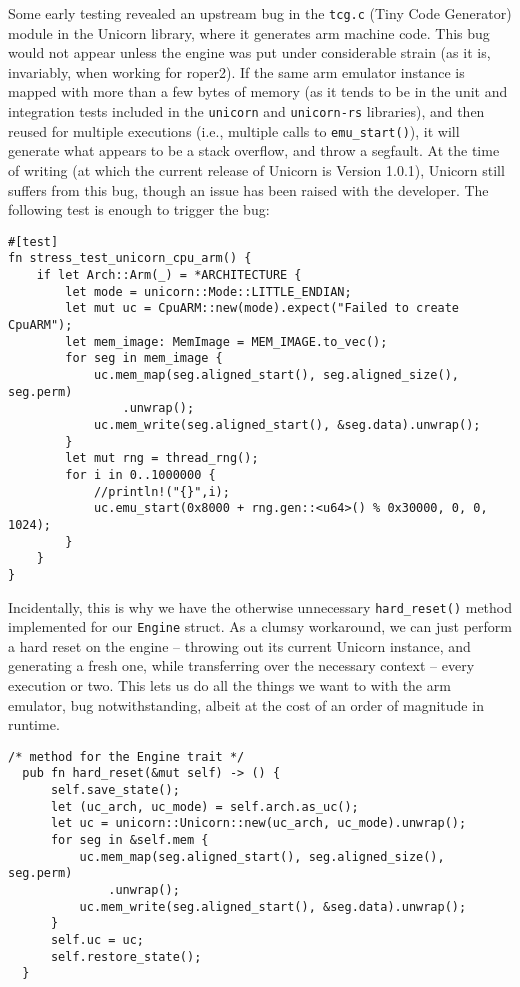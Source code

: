 \documentclass[11pt]{article}
\begin{document}
Some early testing revealed an upstream bug in the \texttt{tcg.c} (Tiny
Code Generator) module in the Unicorn library, where it generates
\gls{arm} machine code. This bug would not appear unless the engine
was put under considerable strain (as it is, invariably, when working
for \gls{roper2}). If the same \gls{arm} emulator instance is mapped with more
than a few bytes of memory (as it tends to be in the unit and integration
tests included in the \texttt{unicorn} and \texttt{unicorn-rs} libraries), and then
reused for multiple executions (i.e., multiple calls to \texttt{emu\_start()}),
it will generate what appears to be a stack overflow, and throw a
segfault. At the time of writing (at which the current release of
Unicorn is Version 1.0.1), Unicorn still suffers from this bug, though
an issue has been raised with the developer. The following test is
enough to trigger the bug:  

\lstset{language=rust,label=orga84523b,caption= ,captionpos=b,numbers=none}
\begin{lstlisting}
#[test]
fn stress_test_unicorn_cpu_arm() {
    if let Arch::Arm(_) = *ARCHITECTURE {
        let mode = unicorn::Mode::LITTLE_ENDIAN;
        let mut uc = CpuARM::new(mode).expect("Failed to create CpuARM");
        let mem_image: MemImage = MEM_IMAGE.to_vec();
        for seg in mem_image {
            uc.mem_map(seg.aligned_start(), seg.aligned_size(), seg.perm)
                .unwrap();
            uc.mem_write(seg.aligned_start(), &seg.data).unwrap();
        }
        let mut rng = thread_rng();
        for i in 0..1000000 {
            //println!("{}",i);
            uc.emu_start(0x8000 + rng.gen::<u64>() % 0x30000, 0, 0, 1024);
        }
    }
}
\end{lstlisting}

Incidentally, this is why we have the otherwise unnecessary \texttt{hard\_reset()}
method implemented for our \texttt{Engine} struct. As a clumsy workaround, we can
just perform a hard reset on the engine -- throwing out its current Unicorn
instance, and generating a fresh one, while transferring over the necessary
context -- every execution or two. This lets us do all the things we want to
with the \gls{arm} emulator, bug notwithstanding, albeit at the cost of an
order of magnitude in runtime. 

\lstset{language=rust,label=org36aceb7,caption= ,captionpos=b,numbers=none}
\begin{lstlisting}
/* method for the Engine trait */
  pub fn hard_reset(&mut self) -> () {
      self.save_state();
      let (uc_arch, uc_mode) = self.arch.as_uc();
      let uc = unicorn::Unicorn::new(uc_arch, uc_mode).unwrap();
      for seg in &self.mem {
          uc.mem_map(seg.aligned_start(), seg.aligned_size(), seg.perm)
              .unwrap();
          uc.mem_write(seg.aligned_start(), &seg.data).unwrap();
      }
      self.uc = uc;
      self.restore_state();
  }
\end{lstlisting}
\end{document}
